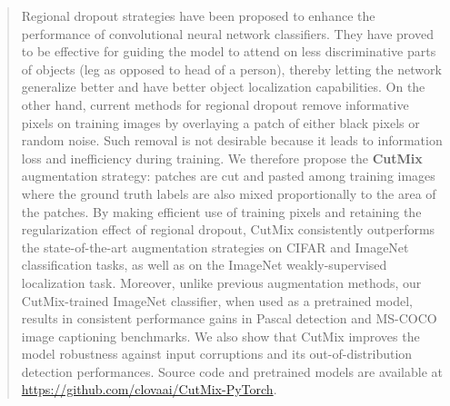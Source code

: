 \begin{abstract}

Regional dropout strategies have been proposed to enhance the performance of convolutional neural network classifiers. They have proved to be effective for guiding the model to attend on less discriminative parts of objects (\eg leg as opposed to head of a person), thereby letting the network generalize better and have better object localization capabilities.
On the other hand, current methods for regional dropout remove informative pixels on training images by overlaying a patch of either black pixels or random noise. 
{Such removal is not desirable because it leads to information loss and inefficiency during training.}
We therefore propose the \textbf{CutMix} augmentation strategy: patches are cut and pasted among training images where the ground truth labels are also mixed proportionally to the area of the patches.
By making efficient use of training pixels and \mbox{retaining} the regularization effect of regional dropout, CutMix consistently outperforms the state-of-the-art augmentation strategies on CIFAR and ImageNet classification tasks, as well as on the ImageNet weakly-supervised localization task.
Moreover, unlike previous augmentation methods, our CutMix-trained ImageNet classifier, when used as a pretrained model, results in consistent performance gains in Pascal detection and MS-COCO image captioning benchmarks.
We also show that CutMix improves the model robustness against input corruptions and its out-of-distribution detection performances.
Source code and pretrained models are available at \href{https://github.com/clovaai/CutMix-PyTorch}{https://github.com/clovaai/CutMix-PyTorch}.
\end{abstract}

